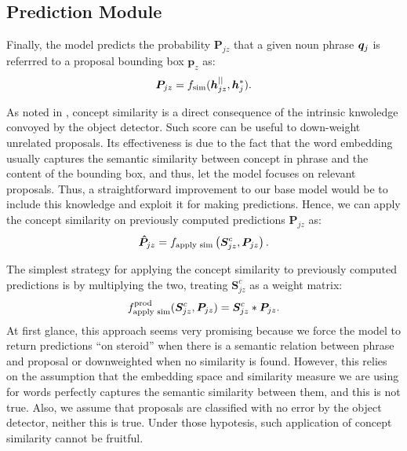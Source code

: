 \subsection{Prediction Module}

Finally, the model predicts the probability $\bm{P}_{jz}$ that a given
noun phrase $\bm{q}_j$ is referrred to a proposal bounding box $\bm{p}_z$
as:
\begin{equation}
  \bm{P}_{jz} = f_{\text{sim}} ( \bm{h}^{||}_{jz} , \bm{h}^*_j ).
\end{equation}

As noted in \cite{chen2018knowledge}, concept similarity is a direct
consequence of the intrinsic knwoledge convoyed by the object
detector. Such score can be useful to down-weight unrelated proposals.
Its effectiveness is due to the fact that the word embedding usually
captures the semantic similarity between concept in phrase and the
content of the bounding box, and thus, let the model focuses on
relevant proposals. Thus, a straightforward improvement to our base
model would be to include this knowledge and exploit it for making
predictions. Hence, we can apply the concept similarity on previously
computed predictions $\bm{P}_{jz}$ as:
\begin{equation}
  \bm{\hat{P}}_{jz} = f_{\text{apply sim}} \left( \bm{S}^c_{jz}, \bm{P}_{jz} \right).
\end{equation}


The simplest strategy for applying the concept similarity to
previously computed predictions is by multiplying the two, treating
$\bm{S}^c_{jz}$ as a weight matrix:
\begin{equation}
  f_{\text{apply sim}}^{\text{prod}} (\bm{S}^c_{jz}, \bm{P}_{jz}) = \bm{S}^c_{jz} * \bm{P}_{jz}.
\end{equation}
At first glance, this approach seems very promising because we force
the model to return predictions ``on steroid'' when there is a
semantic relation between phrase and proposal or downweighted when no
similarity is found. However, this relies on the assumption that the
embedding space and similarity measure we are using for words
perfectly captures the semantic similarity between them, and this is
not true. Also, we assume that proposals are classified with no error
by the object detector, neither this is true. Under those hypotesis,
such application of concept similarity cannot be fruitful. 

